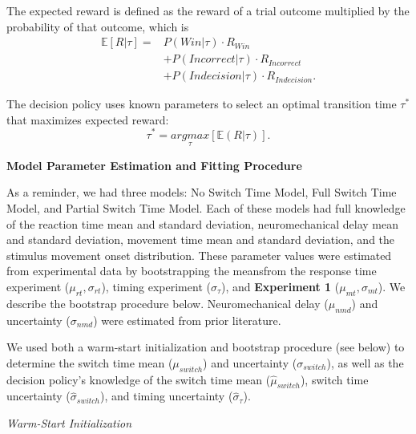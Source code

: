 \documentclass[12pt]{article}
\newcommand\boldblue[1]{\textcolor{mydarkblue}{\textbf{#1}}}
\begin{document}
The expected reward is defined as the reward of a trial outcome multiplied by the probability of that outcome, which is
%
\begin{align}
    \mathbb{E}[R|\tau] = & P(Win|\tau) \cdot R_{Win} \nonumber \\ &+ P(Incorrect|\tau) \cdot R_{Incorrect} \nonumber \\ &+ P(Indecision|\tau) \cdot R_{Indecision}.
\end{align}

The decision policy uses known parameters to select an optimal transition time $\tau^*$ that maximizes expected reward:
\begin{equation}
    \tau^* = \underset{\tau}{argmax}[\mathbb{E}(R|\tau)].
\end{equation}

\vspace{2mm}
\noindent\boldblue{Model Parameter Estimation and Fitting Procedure}

\noindent As a reminder, we had three models: No Switch Time Model, Full Switch Time Model, and Partial Switch Time Model. Each of these models had full knowledge of the reaction time mean and standard deviation, neuromechanical delay mean and standard deviation, movement time mean and standard deviation, and the stimulus movement onset distribution. These parameter values were estimated from experimental data by bootstrapping the meansfrom the response time experiment ($\mu_{rt}, \sigma_{rt}$), timing experiment ($\sigma_{\tau}$), and \boldblue{Experiment 1} ($\mu_{mt}, \sigma_{mt}$). We describe the bootstrap procedure below. Neuromechanical delay ($\mu_{nmd}$) and uncertainty ($\sigma_{nmd}$) were estimated from prior literature\autocite*{normanElectromechanicalDelaySkeletal1979,rossiniClinicalApplicationsMotor1998,brucePrimateFrontalEye1985}.

We used both a warm-start initialization and bootstrap procedure (see below) to determine the switch time mean ($\mu_{switch}$) and uncertainty ($\sigma_{switch}$), as well as the decision policy’s knowledge of the switch time mean ($\hat{\mu}_{switch}$), switch time uncertainty ($\hat{\sigma}_{switch}$), and timing uncertainty ($\hat{\sigma}_{\tau}$).

\vspace{2mm}
\noindent\emph{Warm-Start Initialization}
\end{document}
